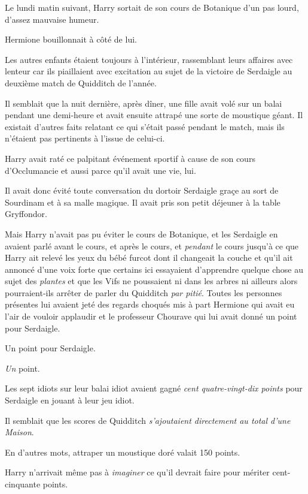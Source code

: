 \later

Le lundi matin suivant, Harry sortait de son cours de Botanique d'un pas lourd, d'assez mauvaise humeur.

Hermione bouillonnait à côté de lui.

Les autres enfants étaient toujours à l'intérieur, rassemblant leurs affaires avec lenteur car ils piaillaient avec excitation au sujet de la victoire de Serdaigle au deuxième match de Quidditch de l'année.

Il semblait que la nuit dernière, après dîner, une fille avait volé sur un balai pendant une demi-heure et avait ensuite attrapé une sorte de moustique géant. Il existait d'autres faits relatant ce qui s'était passé pendant le match, mais ils n'étaient pas pertinents à l'issue de celui-ci.

Harry avait raté ce palpitant événement sportif à cause de son cours d'Occlumancie et aussi parce qu'il avait une vie, lui.

Il avait donc évité toute conversation du dortoir Serdaigle graçe au sort de Sourdinam et à sa malle magique. Il avait pris son petit déjeuner à la table Gryffondor.

Mais Harry n'avait pas pu éviter le cours de Botanique, et les Serdaigle en avaient parlé avant le cours, et après le cours, et \emph{pendant} le cours jusqu'à ce que Harry ait relevé les yeux du bébé furcot dont il changeait la couche et qu'il ait annoncé d'une voix forte que certains ici essayaient d'apprendre quelque chose au sujet des \emph{plantes} et que les Vifs ne poussaient ni dans les arbres ni ailleurs alors pourraient-ils arrêter de parler du Quidditch \emph{par pitié}. Toutes les personnes présentes lui avaient jeté des regards choqués mis à part Hermione qui avait eu l'air de vouloir applaudir et le professeur Chourave qui lui avait donné un point pour Serdaigle.

Un point pour Serdaigle.

\emph{Un} point.

Les sept idiots sur leur balai idiot avaient gagné \emph{cent quatre-vingt-dix points} pour Serdaigle en jouant à leur jeu idiot.

Il semblait que les scores de Quidditch \emph{s'ajoutaient directement au total d'une Maison}.

En d'autres mots, attraper un moustique doré valait 150 points.

Harry n'arrivait même pas à \emph{imaginer} ce qu'il devrait faire pour mériter cent-cinquante points.

